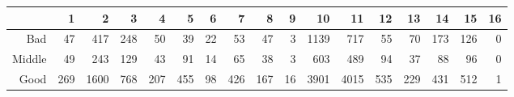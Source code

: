 \begin{table}[ht]
\centering
\begin{tabular}{rrrrrrrrrrrrrrrrr}
  \hline
 & 1 & 2 & 3 & 4 & 5 & 6 & 7 & 8 & 9 & 10 & 11 & 12 & 13 & 14 & 15 & 16 \\ 
  \hline
Bad &  47 & 417 & 248 &  50 &  39 &  22 &  53 &  47 &   3 & 1139 & 717 &  55 &  70 & 173 & 126 &   0 \\ 
  Middle &  49 & 243 & 129 &  43 &  91 &  14 &  65 &  38 &   3 & 603 & 489 &  94 &  37 &  88 &  96 &   0 \\ 
  Good & 269 & 1600 & 768 & 207 & 455 &  98 & 426 & 167 &  16 & 3901 & 4015 & 535 & 229 & 431 & 512 &   1 \\ 
   \hline
\end{tabular}
\end{table}
